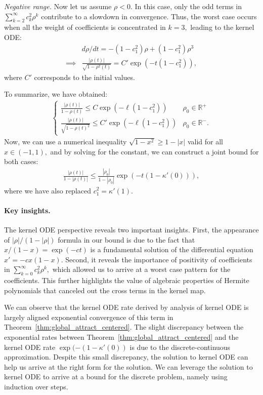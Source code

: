 \documentclass[twoside]{article}
\newcommand{\R}{\mathbb{R}}
\theoremstyle{definition}
\begin{document}
\textit{Negative range.}
Now let us assume $\rho<0.$ In this case, only the odd terms in $\sum_{k=2}^\infty c_k^2 \rho^k$ contribute to a slowdown in convergence. Thus, the worst case occurs when all the weight of coefficients is concentrated in $k=3,$ leading to the kernel ODE:
\begin{align*}
&d\rho/dt = -(1-c_1^2)\rho + (1-c_1^2) \rho^3\\
\implies &\frac{|\rho(t)|}{\sqrt{1-\rho^2(t)}} = C' \exp(-t(1-c_1^2)),
\end{align*}
where $C'$ corresponds to the initial values. 

To summarize, we have obtained:
\begin{align*}
    \begin{cases}
        \frac{|\rho(t)|}{1-\rho(t)} \le C \exp(-\ell(1-c_1^2)) & \rho_0 \in \R^+\\
        \frac{|\rho(t)|}{\sqrt{1-\rho(t)^2}}\le C' \exp(-\ell(1-c_1^2)) & \rho_0\in\R^-.
    \end{cases}
\end{align*}
Now, we can use a numerical inequality $\sqrt{1-x^2} \ge 1-|x|$ valid for all $x\in(-1,1),$ and by solving for the constant, we can construct a joint bound for both cases:
\begin{align*}
    \frac{|\rho(t)|}{1-|\rho(t)|} \le \frac{|\rho_0|}{1-|\rho_0|} \exp(-t (1-\kappa'(0))), 
\end{align*}
where we have also replaced $c_1^2=\kappa'(1).$  

\paragraph{Key insights.}
The kernel ODE perspective reveals two important insights. 
First, the appearance of $|\rho|/(1-|\rho|)$ formula in our bound is due to the fact that $x/(1-x) = \exp( -c t) $ is a fundamental solution of the differential equation $x' = - c x(1-x).$ Second, it reveals the importance of positivity of coefficients in $\sum_{k=0}^\infty c_k^2\rho^k,$ which allowed us to arrive at a worst case pattern for the coefficients. This further highlights the value of algebraic properties of Hermite polynomials that canceled out the cross terms in the kernel map. 

We can observe that the kernel ODE rate derived by analysis of kernel ODE is largely aligned exponential convergence of this term in Theorem~\ref{thm:global_attract_centered}. The slight discrepancy between the exponential rates between Theorem~\ref{thm:global_attract_centered} and the kernel ODE rate $\exp(-(1-\kappa'(0))$ is due to the discrete-continuous approximation. Despite this small discrepancy, the solution to kernel ODE can help us arrive at the right form for the solution. We can leverage the solution to kernel ODE to arrive at a bound for the discrete problem, namely using induction over steps.
\end{document}
